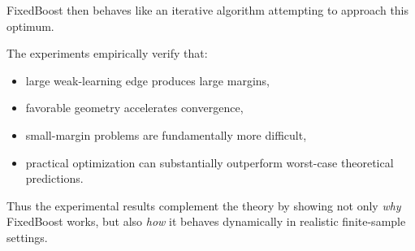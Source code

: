 \documentclass[11pt]{article}
\begin{document}
\begin{enumerate}
\begin{solutionbox}
FixedBoost then behaves like an iterative algorithm attempting to approach this optimum.

The experiments empirically verify that:
\begin{itemize}
    \item large weak-learning edge produces large margins,
    \item favorable geometry accelerates convergence,
    \item small-margin problems are fundamentally more difficult,
    \item practical optimization can substantially outperform worst-case theoretical predictions.
\end{itemize}

Thus the experimental results complement the theory by showing not only \emph{why} FixedBoost works, but also \emph{how} it behaves dynamically in realistic finite-sample settings.

\end{solutionbox}

\end{enumerate}

\end{document}
